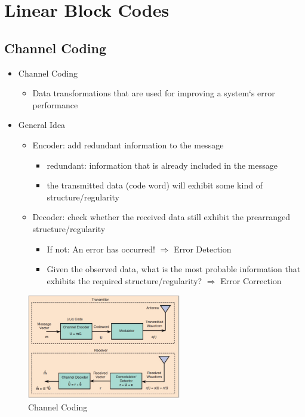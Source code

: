 \hypertarget{linear-block-codes}{%
\section{Linear Block Codes}\label{linear-block-codes}}

\hypertarget{channel-coding}{%
\subsection{Channel Coding}\label{channel-coding}}

\begin{itemize}
\tightlist
\item
  Channel Coding

  \begin{itemize}
  \tightlist
  \item
    Data transformations that are used for improving a system`s error
    performance
  \end{itemize}
\item
  General Idea

  \begin{itemize}
  \tightlist
  \item
    Encoder: add redundant information to the message

    \begin{itemize}
    \tightlist
    \item
      redundant: information that is already included in the message
    \item
      the transmitted data (code word) will exhibit some kind of
      structure/regularity
    \end{itemize}
  \item
    Decoder: check whether the received data still exhibit the
    prearranged structure/regularity

    \begin{itemize}
    \tightlist
    \item
      If not: An error has occurred! $\Rightarrow$ Error Detection
    \item
      Given the observed data, what is the most probable information
      that exhibits the required structure/regularity? $\Rightarrow$
      Error Correction
    \end{itemize}
  \end{itemize}
\end{itemize}

\begin{figure}[H]
\centering
\includegraphics[width=0.6\textwidth]{figures/channelCoding.png}
\caption{Channel Coding}
\end{figure}

